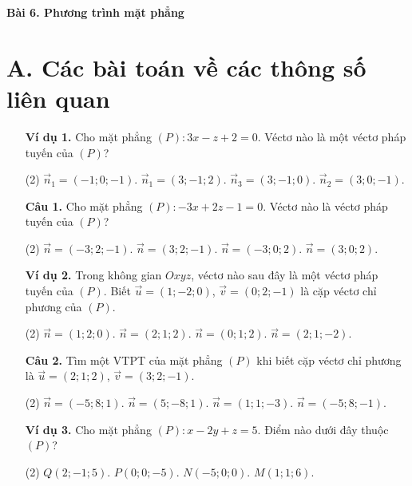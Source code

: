 \documentclass[12pt, a4paper]{article}
\renewcommand{\vec}[1]{\overrightarrow{#1}}
\begin{document}
\begin{center}
    \huge\textbf{Bài 6. Phương trình mặt phẳng}
\end{center}

\section*{A. Các bài toán về các thông số liên quan}
\begin{enumerate}[label=\textbf{\arabic*.}, wide=0pt, leftmargin=*]
    \item[\textbf{Ví dụ 1.}] Cho mặt phẳng \((P) : 3x - z + 2 = 0\). Véctơ nào là một véctơ pháp tuyến của \((P)\)?
    \begin{tasks}(2)
        \task \(\vec{n}_1 = (-1;0;-1)\).
        \task \(\vec{n}_1 = (3;-1;2)\).
        \task \(\vec{n}_3 = (3;-1;0)\).
        \task \(\vec{n}_2 = (3;0;-1)\).
    \end{tasks}

    \item[\textbf{Câu 1.}] Cho mặt phẳng \((P): -3x + 2z - 1 = 0\). Véctơ nào là véctơ pháp tuyến của \((P)\)?
    \begin{tasks}(2)
        \task \(\vec{n} = (-3;2;-1)\).
        \task \(\vec{n} = (3;2;-1)\).
        \task \(\vec{n} = (-3;0;2)\).
        \task \(\vec{n} = (3;0;2)\).
    \end{tasks}
    
    \item[\textbf{Ví dụ 2.}] Trong không gian \(Oxyz\), véctơ nào sau đây là một véctơ pháp tuyến của \((P)\). Biết \(\vec{u} = (1;-2;0)\), \(\vec{v} = (0;2;-1)\) là cặp véctơ chỉ phương của \((P)\).
    \begin{tasks}(2)
        \task \(\vec{n} = (1;2;0)\).
        \task \(\vec{n} = (2;1;2)\).
        \task \(\vec{n} = (0;1;2)\).
        \task \(\vec{n} = (2;1;-2)\).
    \end{tasks}
    
    \item[\textbf{Câu 2.}] Tìm một VTPT của mặt phẳng \((P)\) khi biết cặp véctơ chỉ phương là \(\vec{u} = (2;1;2)\), \(\vec{v} = (3;2;-1)\).
    \begin{tasks}(2)
        \task \(\vec{n} = (-5;8;1)\).
        \task \(\vec{n} = (5;-8;1)\).
        \task \(\vec{n} = (1;1;-3)\).
        \task \(\vec{n} = (-5;8;-1)\).
    \end{tasks}

    \item[\textbf{Ví dụ 3.}] Cho mặt phẳng \((P) : x - 2y + z = 5\). Điểm nào dưới đây thuộc \((P)\)?
    \begin{tasks}(2)
        \task \(Q(2;-1;5)\).
        \task \(P(0;0;-5)\).
        \task \(N(-5;0;0)\).
        \task \(M(1;1;6)\).
    \end{tasks}


\end{enumerate}
\end{document}
